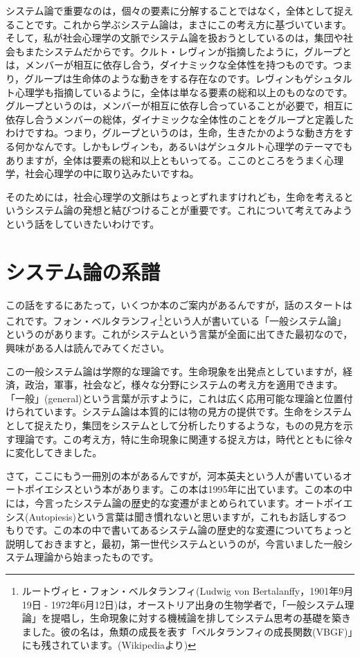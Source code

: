\documentclass{ltjsbook}
\begin{document}
システム論で重要なのは，個々の要素に分解することではなく，全体として捉えることです。これから学ぶシステム論は，まさにこの考え方に基づいています。
そして，私が社会心理学の文脈でシステム論を扱おうとしているのは，集団や社会もまたシステムだからです。クルト・レヴィンが指摘したように，グループとは，メンバーが相互に依存し合う，ダイナミックな全体性を持つものです。つまり，グループは生命体のような動きをする存在なのです。レヴィンもゲシュタルト心理学も指摘しているように，全体は単なる要素の総和以上のものなのです。グループというのは，メンバーが相互に依存し合っていることが必要で，相互に依存し合うメンバーの総体，ダイナミックな全体性のことをグループと定義したわけですね。つまり，グループというのは，生命，生きたかのような動き方をする何かなんです。しかもレヴィンも，あるいはゲシュタルト心理学のテーマでもありますが，全体は要素の総和以上ともいってる。ここのところをうまく心理学，社会心理学の中に取り込みたいですね。

そのためには，社会心理学の文脈はちょっとずれますけれども，生命を考えるというシステム論の発想と結びつけることが重要です。これについて考えてみようという話をしていきたいわけです。

\section{システム論の系譜}
この話をするにあたって，いくつか本のご案内があるんですが，話のスタートはこれです。フォン・ベルタランフィ\footnote{ルートヴィヒ・フォン・ベルタランフィ(Ludwig von Bertalanffy，1901年9月19日 - 1972年6月12日)は，オーストリア出身の生物学者で，「一般システム理論」を提唱し，生命現象に対する機械論を排してシステム思考の基礎を築きました。彼の名は，魚類の成長を表す「ベルタランフィの成長関数(VBGF)」にも残されています。(Wikipediaより)}という人が書いている「一般システム論」というのがあります\parencite{vonBertalanffy}。これがシステムという言葉が全面に出てきた最初なので，興味がある人は読んでみてください。

この一般システム論は学際的な理論です。生命現象を出発点としていますが，経済，政治，軍事，社会など，様々な分野にシステムの考え方を適用できます。「一般」(general)という言葉が示すように，これは広く応用可能な理論と位置付けられています。システム論は本質的には物の見方の提供です。生命をシステムとして捉えたり，集団をシステムとして分析したりするような，ものの見方を示す理論です。この考え方，特に生命現象に関連する捉え方は，時代とともに徐々に変化してきました。

さて，ここにもう一冊別の本があるんですが，河本英夫という人が書いているオートポイエシスという本があります\parencite{KawamotoHideo}。この本は1995年に出ています。この本の中には，今言ったシステム論の歴史的な変遷がまとめられています。オートポイエシス(Autopiesis)という言葉は聞き慣れないと思いますが，これもお話しするつもりです。この本の中で書いてあるシステム論の歴史的な変遷についてちょっと説明しておきますと，最初，第一世代システムというのが，今言いました一般システム理論から始まったものです。
\end{document}

